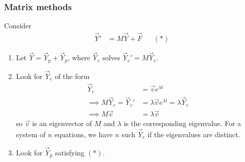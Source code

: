 \documentclass{../template/note}
\begin{document}
    \subsubsection{Matrix methods}

    Consider
    \begin{align*}
        \vec Y' &= M \vec Y + \vec F && (*)
    \end{align*}
    \begin{enumerate}[label=\protect\circled{\arabic*}]
        \item Let \(\vec Y = \vec Y_p + \vec Y_p\), where \(\vec Y_c\) solves \(\vec Y_c' = M \vec Y_c\).
        \item Look for \(\vec Y_c\) of the form
        \begin{align*}
            \vec Y_c &= \vec v e^{\lambda t} \\
            \implies M \vec Y_c = \vec Y_c' &= \lambda \vec v e^{\lambda t} = \lambda \vec Y_c \\
            \implies M \vec v &= \lambda \vec v
        \end{align*}
        so \(\vec v\) is an eigenvector of \(M\) and \(\lambda\) is the corresponding eigenvalue. For a system of \(n\) equations, we have \(n\) such \(\vec Y_c\) if the eigenvalues are distinct.
        \item Look for \(\vec Y_p\) satisfying \((*)\).
        
    \end{enumerate}
    
\end{document}
